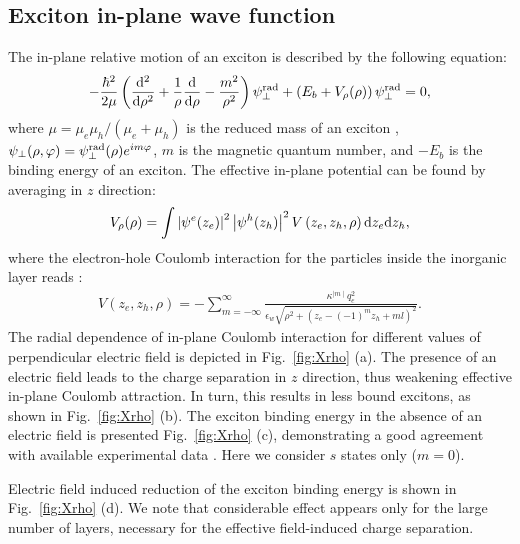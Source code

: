 \documentclass[prb,twocolumn,preprintnumbers,superscriptaddress]{revtex4}
\begin{document}
\subsection{Exciton in-plane wave function}

The in-plane relative motion of an exciton is described by the following equation:
%
\begin{align}
    \label{Schr_r}
    - \frac{\hbar ^2}{2\mu} \left( \frac{{\rm d}^2}{ {\rm d} \rho^2} + \frac{1}{\rho} \frac{{\rm d}}{{\rm d} \rho} - \frac{m^2}{\rho^2} \right) \psi_{\perp}^{\rm rad} + \left( E_b + V_{\rho}(\rho) \right) \psi_{\perp}^{\rm rad} = 0 ,
\end{align}
%
where $\mu=\mu_e \mu_h/(\mu_e+\mu_h)$ is the reduced mass of an exciton , $\psi_{\perp} (\rho,\varphi) = \psi_{\perp}^{\rm rad} (\rho) e^{im\varphi}$, $m$ is the magnetic quantum number, and $-E_b$ is the binding energy of an exciton. The effective in-plane potential can be found by averaging in $z$ direction:
%
\begin{align}
    \label{V_rho}
    V_{\rho} (\rho) =
    \int \left|\psi^e (z_e)\right|^2 \left|\psi^h(z_h)\right|^2
    V\left( z_e,z_h,\rho\right) {\rm d} z_e {\rm d} z_h,
\end{align}
%
where the electron-hole Coulomb interaction for the particles inside the inorganic layer reads \cite{Kumagai1989}:
%
\begin{align}
   V\left( z_e,z_h,\rho\right) 
   = - \sum_{m=-\infty}^{\infty} \frac{\kappa^{\mid m\mid} q_e^2}
        {\epsilon_w \sqrt{
            \rho^2 +  ( z_e - \left( - 1 \right)^m z_h + m l)^2}} .
\end{align}
%
The radial dependence of in-plane Coulomb interaction for different values of perpendicular electric field is depicted in Fig.~\ref{fig:Xrho} (a).
The presence of an electric field leads to the charge separation in $z$ direction,  thus weakening effective in-plane Coulomb attraction. In turn, this results in less bound excitons, as shown in Fig.~\ref{fig:Xrho} (b).
The exciton binding energy in the absence of an electric field is presented Fig.~\ref{fig:Xrho} (c), demonstrating a good agreement with available experimental data \cite{Blancon2018}. Here we consider $s$ states only ($m=0$).

Electric field induced reduction of the exciton binding energy is shown in Fig.~\ref{fig:Xrho} (d). We note that considerable effect appears only for the large number of layers, necessary for the effective field-induced charge separation.
\end{document}
